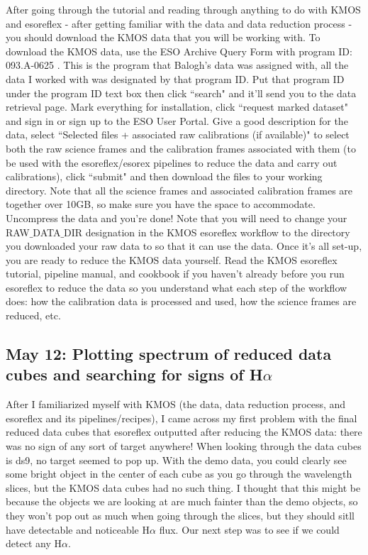 \documentclass[10pt,letterpaper]{article}
\begin{document}
After going through the tutorial and reading through anything to do with KMOS and esoreflex - after getting familiar with the data and data reduction process - you should download the KMOS data that you will be working with. To download the KMOS data, use the ESO Archive Query Form \cite{ESO Archive Query Form} with program ID: 093.A-0625 . This is the program that Balogh's data was assigned with, all the data I worked with was designated by that program ID. Put that program ID under the program ID text box then click ``search" and it'll send you to the data retrieval page. Mark everything for installation, click ``request marked dataset" and sign in or sign up to the ESO User Portal. Give a good description for the data, select ``Selected files + associated raw calibrations (if available)" to select both the raw science frames and the calibration frames associated with them (to be used with the esoreflex/esorex pipelines to reduce the data and carry out calibrations), click ``submit" and then download the files to your working directory. Note that all the science frames and associated calibration frames are together over 10GB, so make sure you have the space to accommodate. Uncompress the data and you're done! Note that you will need to change your RAW$\_$DATA$\_$DIR designation in the KMOS esoreflex workflow to the directory you downloaded your raw data to so that it can use the data. Once it's all set-up, you are ready to reduce the KMOS data yourself. Read the KMOS esoreflex tutorial, pipeline manual, and cookbook if you haven't already before you run esoreflex to reduce the data so you understand what each step of the workflow does: how the calibration data is processed and used, how the science frames are reduced, etc. 

\subsection{May 12: Plotting spectrum of reduced data cubes and searching for signs of H$\alpha$}
After I familiarized myself with KMOS (the data, data reduction process, and esoreflex and its pipelines/recipes), I came across my first problem with the final reduced data cubes that esoreflex outputted after reducing the KMOS data: there was no sign of any sort of target anywhere! When looking through the data cubes is ds9, no target seemed to pop up. With the demo data, you could clearly see some bright object in the center of each cube as you go through the wavelength slices, but the KMOS data cubes had no such thing. I thought that this might be because the objects we are looking at are much fainter than the demo objects, so they won't pop out as much when going through the slices, but they should sitll have detectable and noticeable H$\alpha$ flux. Our next step was to see if we could detect any H$\alpha$.\\
\end{document}
